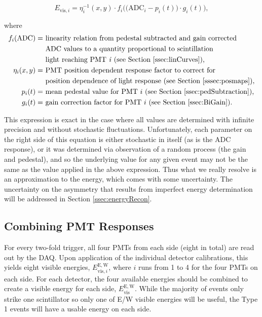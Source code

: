 \begin{equation} \label{eq:EvisResponse}
E_{\mathrm{vis},i} = \eta_i^{-1}(x,y) \cdot f_i\bigg( \Big( \mathrm{ADC}_i - p_i(t) \Big) \cdot g_i(t) \bigg)  ,
\end{equation}

\noindent where 
\begin{align*}
  f_i(\mathrm{ADC}) = & \text{ linearity relation from pedestal subtracted and gain corrected} \\
  & \text{ ADC values to a quantity proportional to scintillation} \\
  & \text{ light reaching PMT \textit{i} (see Section \ref{ssec:linCurves}),}\\
  \eta_i(x,y) = &\text{ PMT position dependent response factor to correct for} \\
    & \text{ position dependence of light response (see Section \ref{sssec:posmaps}),} \\
  p_i(t) = &\text{ mean pedestal value for PMT } i \text{ (see Section \ref{ssec:pedSubtraction}),} \\
  g_i(t) = &\text{ gain correction factor for PMT }i \text{ (see Section \ref{ssec:BiGain})}.
\end{align*}

This expression is exact in the case where all values are determined with infinite
precision and without stochastic fluctuations. Unfortunately, each parameter on the right
side of this equation is either stochastic in itself (as is the ADC response), or it was
determined via observation of a random process (the gain and pedestal), and so
the underlying value for any given event may not be the same as the value applied in the
above expression. Thus what we
really resolve is an approximation to the energy, which comes with some uncertainty. The uncertainty
on the asymmetry that results from imperfect energy determination
will be addressed in Section \ref{ssec:energyRecon}.


\subsection{Combining PMT Responses} \label{ssec:combinePMT}

For every two-fold trigger, all four PMTs from each side (eight in total) are read out by the
DAQ. Upon application of the individual detector calibrations, this yields
eight visible energies, $E_{\mathrm{vis},i}^\mathrm{E,W}$, where $i$ runs from 1 to 4 for the
four PMTs on each side. For each detector, the four available energies should
be combined to create a visible energy for each side, $E_{\mathrm{vis}}^\mathrm{E,W}$. While the
majority of events only strike one scintillator so only one of E/W visible energies will
be useful, the Type 1 events will have a usable energy on each side.

